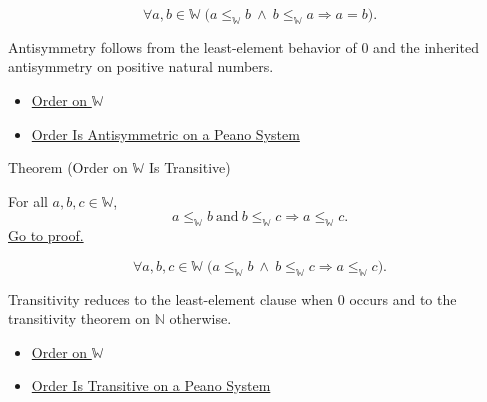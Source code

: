 \begin{remark*}
\[
\forall a,b\in\mathbb{W}\;
\bigl(a\leq_{\mathbb{W}}b\ \wedge\ b\leq_{\mathbb{W}}a
\Longrightarrow a=b\bigr).
\]
\end{remark*}

\begin{remark*}[Interpretation]
Antisymmetry follows from the least-element behavior of $0$ and the inherited
antisymmetry on positive natural numbers.
\end{remark*}

\begin{dependencies}
\begin{itemize}
  \item \hyperref[def:order-on-w]{Order on $\mathbb{W}$}
  \item \hyperref[thm:order-antisymmetric-on-peano-system]{Order Is Antisymmetric on a Peano System}
\end{itemize}
\end{dependencies}

\begin{theorembox}{Theorem (Order on \texorpdfstring{$\mathbb{W}$}{W} Is Transitive)}
\begin{theorem}
\label{thm:order-on-w-transitive}
For all $a,b,c\in\mathbb{W}$,
\[
a\leq_{\mathbb{W}}b\ \text{and}\ b\leq_{\mathbb{W}}c
\Longrightarrow a\leq_{\mathbb{W}}c.
\]
\hyperref[prf:order-on-w-transitive]{Go to proof.}
\end{theorem}
\end{theorembox}

\begin{remark*}
\[
\forall a,b,c\in\mathbb{W}\;
\bigl(a\leq_{\mathbb{W}}b\ \wedge\ b\leq_{\mathbb{W}}c
\Longrightarrow a\leq_{\mathbb{W}}c\bigr).
\]
\end{remark*}

\begin{remark*}[Interpretation]
Transitivity reduces to the least-element clause when $0$ occurs and to the
transitivity theorem on $\mathbb{N}$ otherwise.
\end{remark*}

\begin{dependencies}
\begin{itemize}
  \item \hyperref[def:order-on-w]{Order on $\mathbb{W}$}
  \item \hyperref[thm:order-transitive-on-peano-system]{Order Is Transitive on a Peano System}
\end{itemize}
\end{dependencies}

